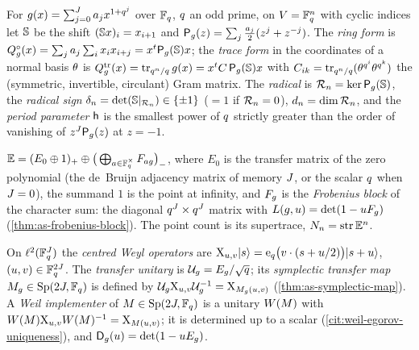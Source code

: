 \begin{definition}
\label{def:as-ring-forms}
For $g(x) = \sum_{j=0}^{J}a_jx^{1+q^j}$ over $\mathbb F_q$, $q$ an odd prime, on
$V = \mathbb F_q^n$ with cyclic indices let $\mathbb S$ be the shift $(\mathbb S x)_i = x_{i+1}$ and
$\mathsf P_{g}(z) = \sum_j\tfrac{a_j}{2}(z^j+z^{-j})$. The \emph{ring form} is
$Q^{\circ}_{g}(x) = \sum_ja_j\sum_{i}x_ix_{i+j} = x^{t}\mathsf P_{g}(\mathbb S)x$; the \emph{trace form}
in the coordinates of a normal basis $\theta$ is $Q^{\mathrm{tr}}_{g}(x) = \operatorname{tr}_{q^n/q} g(x) =
x^{t}C\,\mathsf P_{g}(\mathbb S)x$ with $C_{ik} = \operatorname{tr}_{q^n/q}(\theta^{q^{i}}\theta^{q^{k}})$ the
(symmetric, invertible, circulant) Gram matrix. The \emph{radical} is $\mathcal R_{n} =
\ker\mathsf P_{g}(\mathbb S)$, the \emph{radical sign} $\delta_{n} = \det(\mathbb S|_{\mathcal R_{n}})\in\{\pm1\}$
($=1$ if $\mathcal R_{n}=0$), $d_{n} = \dim\mathcal R_{n}$, and the \emph{period parameter}
$\mathsf h$ is the smallest power of $q$ strictly greater than the order of vanishing of
$z^{J}\mathsf P_{g}(z)$ at $z=-1$.
\end{definition}

\begin{definition}
\label{def:super-transfer}
$\mathbb E = (E_0\oplus1)_{+}\oplus\big(\bigoplus_{a\in\mathbb F_q^\times}F_{ag}\big)_{-}$, where $E_0$
is the transfer matrix of the zero polynomial (the de~Bruijn adjacency matrix of memory
$J$, or the scalar $q$ when $J=0$), the summand $1$ is the point at
infinity, and $F_{g}$ is the \emph{Frobenius block} of the character sum: the diagonal
$q^{J}\times q^{J}$ matrix with $L(g,u) = \det(1-uF_{g})$
(\cref{thm:as-frobenius-block}). The point count is its supertrace,
$N_{n} = \operatorname{str}\mathbb E^{n}$.
\end{definition}

\begin{definition}
\label{def:weyl-symplectic}
On $\ell^2(\mathbb F_q^{J})$ the \emph{centred Weyl operators} are
$\mathrm{X}_{u,v}|s\rangle = \mathrm e_q\big(v\cdot(s+u/2)\big)|s+u\rangle$, $(u,v)\in\mathbb F_q^{2J}$.
The \emph{transfer unitary} is $\mathcal U_{g} = E_g/\sqrt{q}$; its \emph{symplectic
transfer map} $M_{g}\in\mathrm{Sp}(2J,\mathbb F_q)$ is defined by
$\mathcal U_{g}\mathrm{X}_{u,v}\mathcal U_{g}^{-1} = \mathrm{X}_{M_{g}(u,v)}$ (\cref{thm:as-symplectic-map}). A
\emph{Weil implementer} of $M\in\mathrm{Sp}(2J,\mathbb F_q)$ is a unitary $W(M)$ with
$W(M)\mathrm{X}_{u,v}W(M)^{-1} = \mathrm{X}_{M(u,v)}$; it is determined up to a scalar
(\cref{cit:weil-egorov-uniqueness}), and $\mathsf D_{g}(u) = \det(1-uE_g)$.
\end{definition}
